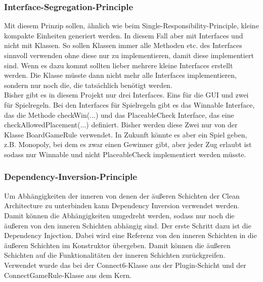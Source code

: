 \documentclass[12pt]{article}
\begin{document}
\subsubsection{Interface-Segregation-Principle}
Mit diesem Prinzip sollen, ähnlich wie beim Single-Responsibility-Principle, kleine kompakte Einheiten generiert werden. In diesem Fall aber mit Interfaces und nicht mit Klassen. So sollen Klassen immer alle Methoden etc. des Interfaces sinnvoll verwenden ohne diese nur zu implementieren, damit diese implementiert sind. Wenn es dazu kommt sollten lieber mehrere kleine Interfaces erstellt werden. Die Klasse müsste dann nicht mehr alle Interfaces implementieren, sondern nur noch die, die tatsächlich benötigt werden.
\\

Bisher gibt es in diesem Projekt nur drei Interfaces. Eins für die GUI und zwei für Spielregeln. Bei den Interfaces für Spielregeln gibt es das Winnable Interface, das die Methode checkWin(...) und das PlaceableCheck Interface, das eine checkAllowedPlacement(...) definiert. Bisher werden diese Zwei nur von der Klasse BoardGameRule verwendet. In Zukunft könnte es aber ein Spiel geben, z.B. Monopoly, bei dem es zwar einen Gewinner gibt, aber jeder Zug erlaubt ist sodass nur Winnable und nicht PlaceableCheck implementiert werden müsste.



\subsubsection{Dependency-Inversion-Principle}

Um Abhängigkeiten der inneren von denen der äußeren Schichten der Clean Architecture zu unterbinden kann Dependency Inversion verwendet werden. Damit können die Abhängigkeiten umgedreht werden, sodass nur noch die äußeren von den inneren Schichten abhängig sind. Der erste Schritt dazu ist die Dependency Injection. Dabei wird eine Referenz von den inneren Schichten in die äußeren Schichten im Konstruktor übergeben. Damit können die äußeren Schichten auf die Funktionalitäten der inneren Schichten zurückgreifen. Verwendet wurde das bei der Connect6-Klasse aus der Plugin-Schicht und der ConnectGameRule-Klasse aus dem Kern.
\end{document}
